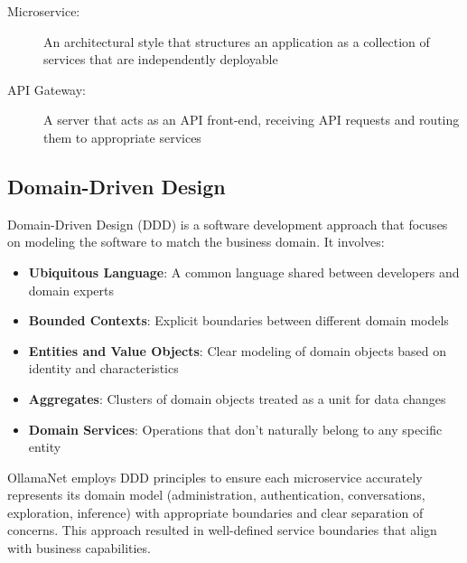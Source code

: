 \begin{terminology}
\begin{description}
    \item[Microservice:] An architectural style that structures an application as a collection of services that are independently deployable
    \item[API Gateway:] A server that acts as an API front-end, receiving API requests and routing them to appropriate services
\end{description}
\end{terminology}

\subsection{Domain-Driven Design}

Domain-Driven Design (DDD) is a software development approach that focuses on modeling the software to match the business domain. It involves:

\begin{itemize}
    \item \textbf{Ubiquitous Language}: A common language shared between developers and domain experts
    \item \textbf{Bounded Contexts}: Explicit boundaries between different domain models
    \item \textbf{Entities and Value Objects}: Clear modeling of domain objects based on identity and characteristics
    \item \textbf{Aggregates}: Clusters of domain objects treated as a unit for data changes
    \item \textbf{Domain Services}: Operations that don't naturally belong to any specific entity
\end{itemize}

OllamaNet employs DDD principles to ensure each microservice accurately represents its domain model (administration, authentication, conversations, exploration, inference) with appropriate boundaries and clear separation of concerns. This approach resulted in well-defined service boundaries that align with business capabilities.


